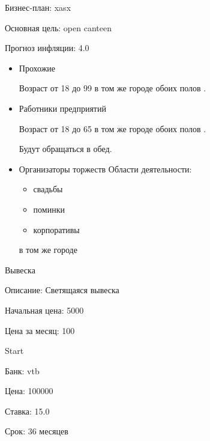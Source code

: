 \documentclass[a4paper,12pt]{article}
\begin{document}
  Бизнес-план: xasx
  
  Основная цель: open canteen

  Прогноз инфляции: 4.0


  \begin{itemize}
  
    \item Прохожие

    Возраст от 18 до 99
    в том же городе
     обоих полов
    .
    
  
    \item Работники предприятий

    Возраст от 18 до 65
    в том же городе
     обоих полов
    .
    
    Будут обращаться в обед.
    
  
  \end{itemize}



  \begin{itemize}
  
    \item Организаторы торжеств
    Области деятельности:
    \begin{itemize}
    
    \item свадьбы
    
    \item  поминки
    
    \item  корпоративы
    
    \end{itemize}
    в том же городе
  
  \end{itemize}



  
    
      Вывеска

      Описание: Светящаяся вывеска
      
      Начальная цена: 5000
      
      Цена за месяц: 100
    
  



  
      Start

      Банк: vtb
      
      Цена: 100000
      
      Ставка: 15.0

      Срок: 36 месяцев
  
\end{document}
